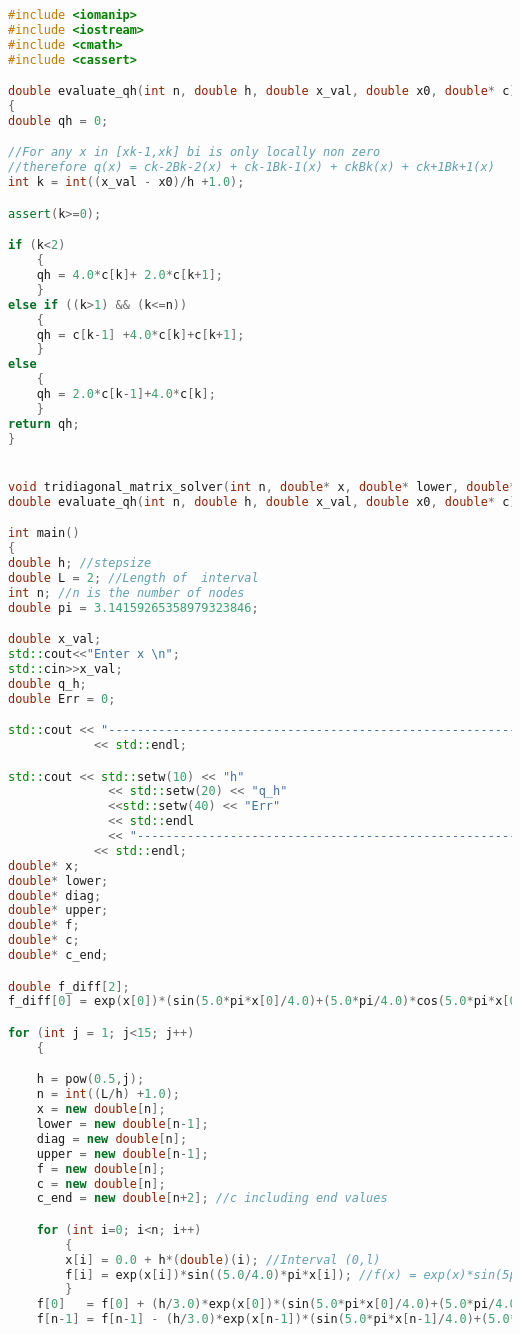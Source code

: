 \documentclass[a4paper,12pt,onecolumn,final]{article}
\begin{document}
\begin{lstlisting}[language=C++]
#include <iomanip>
#include <iostream>
#include <cmath>
#include <cassert>

double evaluate_qh(int n, double h, double x_val, double x0, double* c)
{
double qh = 0;

//For any x in [xk-1,xk] bi is only locally non zero
//therefore q(x) = ck-2Bk-2(x) + ck-1Bk-1(x) + ckBk(x) + ck+1Bk+1(x)
int k = int((x_val - x0)/h +1.0);

assert(k>=0);

if (k<2)
    {
    qh = 4.0*c[k]+ 2.0*c[k+1];
    }
else if ((k>1) && (k<=n))
    {
    qh = c[k-1] +4.0*c[k]+c[k+1];
    }
else
    {
    qh = 2.0*c[k-1]+4.0*c[k];
    }
return qh;
}


void tridiagonal_matrix_solver(int n, double* x, double* lower, double* diag, double* upper, double* f);
double evaluate_qh(int n, double h, double x_val, double x0, double* c);

int main()
{
double h; //stepsize
double L = 2; //Length of  interval
int n; //n is the number of nodes
double pi = 3.14159265358979323846;

double x_val;
std::cout<<"Enter x \n";
std::cin>>x_val;
double q_h;
double Err = 0;

std::cout << "--------------------------------------------------------------------------"
            << std::endl;

std::cout << std::setw(10) << "h"
              << std::setw(20) << "q_h"
              <<std::setw(40) << "Err"
              << std::endl
              << "--------------------------------------------------------------------------"
            << std::endl;
double* x;
double* lower;
double* diag;
double* upper;
double* f;
double* c;
double* c_end;

double f_diff[2];
f_diff[0] = exp(x[0])*(sin(5.0*pi*x[0]/4.0)+(5.0*pi/4.0)*cos(5.0*pi*x[0]/4.0));

for (int j = 1; j<15; j++)
    {

    h = pow(0.5,j);
    n = int((L/h) +1.0);
    x = new double[n];
    lower = new double[n-1];
    diag = new double[n];
    upper = new double[n-1];
    f = new double[n];
    c = new double[n];
    c_end = new double[n+2]; //c including end values

    for (int i=0; i<n; i++)
        {
        x[i] = 0.0 + h*(double)(i); //Interval (0,l)
        f[i] = exp(x[i])*sin((5.0/4.0)*pi*x[i]); //f(x) = exp(x)*sin(5pi/4)x)
        }
    f[0]   = f[0] + (h/3.0)*exp(x[0])*(sin(5.0*pi*x[0]/4.0)+(5.0*pi/4.0)*cos(5.0*pi*x[0]/4.0));
    f[n-1] = f[n-1] - (h/3.0)*exp(x[n-1])*(sin(5.0*pi*x[n-1]/4.0)+(5.0*pi/4.0)*cos(5.0*pi*x[n-1]/4.0));


\end{lstlisting}
\end{document}
